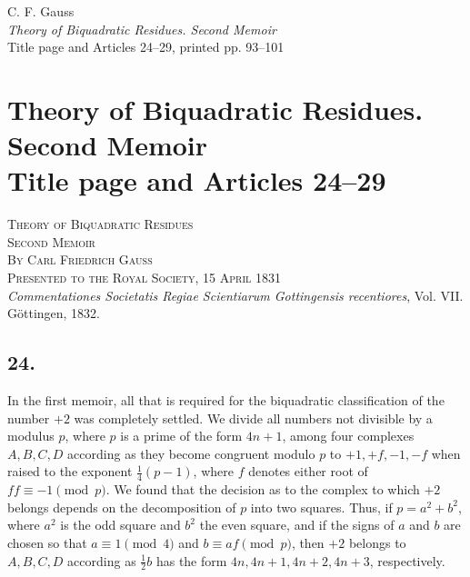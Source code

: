 \documentclass[12pt]{article}
\begin{document}
\begin{center}
{\Large C. F. Gauss}\\[3pt]
{\large \emph{Theory of Biquadratic Residues. Second Memoir}}\\[3pt]
{\large Title page and Articles 24--29, printed pp. 93--101}
\end{center}

\section*{Theory of Biquadratic Residues. Second Memoir\\
Title page and Articles 24--29}

\begin{center}
\textsc{Theory of Biquadratic Residues}\\
\textsc{Second Memoir}\\[2pt]
\textsc{By Carl Friedrich Gauss}\\
\textsc{Presented to the Royal Society, 15 April 1831}\\
\emph{Commentationes Societatis Regiae Scientiarum Gottingensis recentiores}, Vol. VII.\\
Göttingen, 1832.
\end{center}

\subsection*{24.}

In the first memoir, all that is required for the biquadratic classification of the number $+2$ was completely settled. We divide all numbers not divisible by a modulus $p$, where $p$ is a prime of the form $4n+1$, among four complexes $A,B,C,D$ according as they become congruent modulo $p$ to $+1,+f,-1,-f$ when raised to the exponent $\frac14(p-1)$, where $f$ denotes either root of $ff\equiv-1\pmod p$. We found that the decision as to the complex to which $+2$ belongs depends on the decomposition of $p$ into two squares. Thus, if $p=a^2+b^2$, where $a^2$ is the odd square and $b^2$ the even square, and if the signs of $a$ and $b$ are chosen so that $a\equiv1\pmod4$ and $b\equiv af\pmod p$, then $+2$ belongs to $A,B,C,D$ according as $\frac12 b$ has the form $4n,4n+1,4n+2,4n+3$, respectively.
\end{document}
